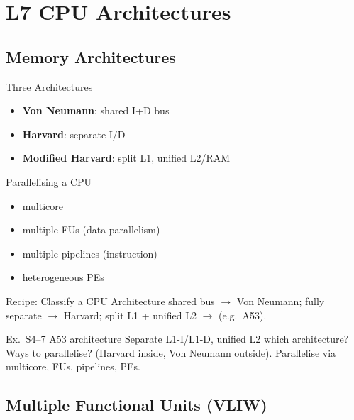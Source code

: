 \section{L7 CPU Architectures}

\subsection{Memory Architectures}


\begin{definition}{Three Architectures}
    \begin{itemize}
        \item \textbf{Von Neumann}: shared I+D bus
        \item \textbf{Harvard}: separate I/D
        \item \textbf{Modified Harvard}: split L1, unified L2/RAM
    \end{itemize}
\end{definition}

\begin{concept}{Parallelising a CPU}
    \begin{itemize}
        \item multicore
        \item multiple FUs (data parallelism)
        \item multiple pipelines (instruction)
        \item heterogeneous PEs
    \end{itemize}
\end{concept}

\multend

\begin{KR}{Recipe: Classify a CPU Architecture}
    shared bus $\to$ Von Neumann; fully separate $\to$ Harvard; split L1 + unified L2 $\to$  (e.g.\ A53).
\end{KR}

\begin{example2}{Ex.\ S4--7 A53 architecture}
    Separate L1-I/L1-D, unified L2 which architecture? Ways to parallelise?
    \tcblower
     (Harvard inside, Von Neumann outside). Parallelise via multicore, FUs, pipelines, PEs.
\end{example2}

\subsection{Multiple Functional Units (VLIW)}

